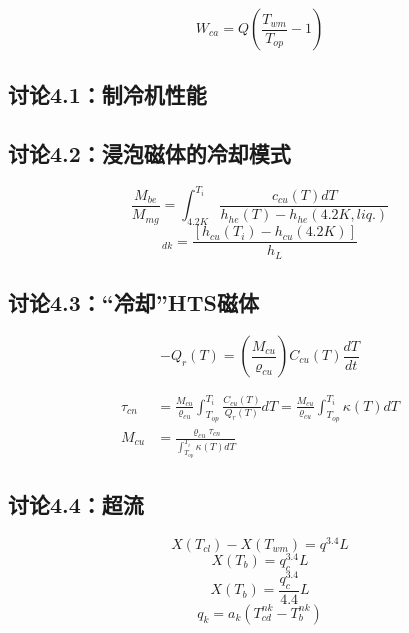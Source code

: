 \begin{equation*}%
W_{ca}=Q(\frac{T_{wm}}{T_{op}}-1) \tag{4.1}
\end{equation*}



\subsection{讨论4.1：制冷机性能}


\subsection{讨论4.2：浸泡磁体的冷却模式}
\begin{equation}%
\frac{M_{be}}{M_{mg}}=\int_{4.2K}^{T_i}\frac{c_{cu}(T)dT}{h_{he}(T)-h_{he}(4.2K,liq.)}
\end{equation}
\begin{equation}%
[\frac{M_{be}}{M_{mg}}]_{dk}=\frac{[h_{cu}(T_i)-h_{cu}(4.2K)]}{h_L}
\end{equation}


\subsection{讨论4.3：“冷却”HTS磁体}
\begin{equation}%
-Q_r(T)=(\frac{M_{cu}}{\varrho_{cu}})C_{cu}(T)\frac{dT}{dt}
\end{equation}

\begin{subequations}%
\begin{align}
\tau_{cn}&=\frac{M_{cu}}{\varrho_{cu}}\int_{T_{op}}^{T_i}\frac{C_{cu}(T)}{Q_r(T)}dT=\frac{M_{cu}}{\varrho_{cu}}\int_{T_{op}}^{T_i}\kappa(T)dT\\
M_{cu}&=\frac{\varrho_{cu}\tau_{cn}}{\int_{T_{op}}^{T_i}\kappa(T)dT}
\end{align}
\end{subequations}



\subsection{讨论4.4：超流}


\begin{equation}%
X(T_{cl})-X(T_{wm})=q^{3.4}L
\end{equation}
\begin{equation}%
X(T_b)=q_{c}^{3.4}L
\end{equation}
\begin{equation}%
X(T_b)=\frac{q_{c}^{3.4}}{4.4}L
\end{equation}
\begin{equation}%
q_k=a_k(T_{cd}^{nk}-T_{b}^{nk})
\end{equation}

